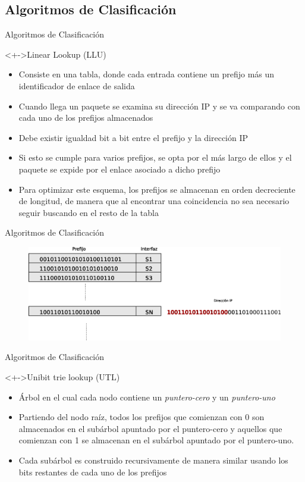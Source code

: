 \documentclass[xcolor=dvipsnames]{beamer}
\begin{document}
\subsection{Algoritmos de Clasificación}
\begin{frame}{Algoritmos de Clasificación}
\begin{block}<+->{Linear Lookup (LLU)}   
    \begin{itemize}
      \scriptsize     	
	\item Consiste en una tabla, donde cada entrada contiene un prefijo más un identificador de enlace de salida
	\item Cuando llega un paquete se examina su dirección IP y se va comparando con cada uno de los prefijos almacenados
	\item Debe existir igualdad bit a bit entre el prefijo y la dirección IP
	\item Si esto se cumple para varios prefijos, se opta por el más largo de ellos y el paquete se expide por el enlace asociado a dicho prefijo
	\item Para optimizar este esquema, los prefijos se almacenan en orden decreciente de longitud, de manera que al encontrar una coincidencia no sea necesario seguir buscando en el resto de la tabla
    \end{itemize}
  \end{block}
\end{frame}

\begin{frame}{Algoritmos de Clasificación}
\begin{figure}
\centering 
\includegraphics[scale=0.40]{figures/linear.eps}
\end{figure}
\end{frame}


\begin{frame}{Algoritmos de Clasificación}
  \begin{block}<+->{Unibit trie lookup (UTL)}   
    \begin{itemize}
      \scriptsize
     	\item Árbol en el cual cada nodo contiene un \textit{puntero-cero }y un \textit{puntero-uno}
	\item Partiendo del nodo raíz, todos los prefijos que comienzan con 0 son almacenados en el subárbol apuntado por el puntero-cero y aquellos que comienzan con 1 se almacenan en el subárbol apuntado por el puntero-uno.
	\item Cada subárbol es construido recursivamente de manera similar usando los bits restantes de cada uno de los prefijos
    \end{itemize}
  \end{block}
\end{frame}
\end{document}
